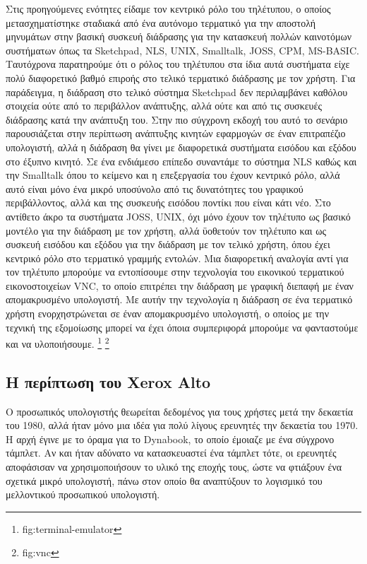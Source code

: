 \documentclass[
]{article}
\begin{document}
Στις προηγούμενες ενότητες είδαμε τον κεντρικό ρόλο του τηλέτυπου, ο
οποίος μετασχηματίστηκε σταδιακά από ένα αυτόνομο τερματικό για την
αποστολή μηνυμάτων στην βασική συσκευή διάδρασης για την κατασκευή
πολλών καινοτόμων συστήματων όπως τα Sketchpad, NLS, UNIX, Smalltalk,
JOSS, CPM, MS-BASIC. Ταυτόχρονα παρατηρούμε ότι ο ρόλος του τηλέτυπου
στα ίδια αυτά συστήματα είχε πολύ διαφορετικό βαθμό επιροής στο τελικό
τερματικό διάδρασης με τον χρήστη. Για παράδειγμα, η διάδραση στο τελικό
σύστημα Sketchpad δεν περιλαμβάνει καθόλου στοιχεία ούτε από το
περιβάλλον ανάπτυξης, αλλά ούτε και από τις συσκευές διάδρασης κατά την
ανάπτυξη του. Στην πιο σύγχρονη εκδοχή του αυτό το σενάριο παρουσιάζεται
στην περίπτωση ανάπτυξης κινητών εφαρμογών σε έναν επιτραπέζιο
υπολογιστή, αλλά η διάδραση θα γίνει με διαφορετικά συστήματα εισόδου
και εξόδου στο έξυπνο κινητό. Σε ένα ενδιάμεσο επίπεδο συναντάμε το
σύστημα NLS καθώς και την Smalltalk όπου το κείμενο και η επεξεργασία
του έχουν κεντρικό ρόλο, αλλά αυτό είναι μόνο ένα μικρό υποσύνολο από
τις δυνατότητες του γραφικού περιβάλλοντος, αλλά και της συσκευής
εισόδου ποντίκι που είναι κάτι νέο. Στο αντίθετο άκρο τα συστήματα JOSS,
UNIX, όχι μόνο έχουν τον τηλέτυπο ως βασικό μοντέλο για την διάδραση με
τον χρήστη, αλλά ϋοθετούν τον τηλέτυπο και ως συσκευή εισόδου και εξόδου
για την διάδραση με τον τελικό χρήστη, όπου έχει κεντρικό ρόλο στο
τερματικό γραμμής εντολών. Μια διαφορετική αναλογία αντί για τον
τηλέτυπο μπορούμε να εντοπίσουμε στην τεχνολογία του εικονικού
τερματικού εικονοστοιχείων VNC, το οποίο επιτρέπει την διάδραση με
γραφική διεπαφή με έναν απομακρυσμένο υπολογιστή. Με αυτήν την
τεχνολογία η διάδραση σε ένα τερματικό χρήστη ενορχηστρώνεται σε έναν
απομακρυσμένο υπολογιστή, ο οποίος με την τεχνική της εξομοίωσης μπορεί
να έχει όποια συμπεριφορά μπορούμε να φανταστούμε και να υλοποιήσουμε.
\footnote{fig:terminal-emulator} \footnote{fig:vnc}

\hypertarget{ux3b7-ux3c0ux3b5ux3c1ux3afux3c0ux3c4ux3c9ux3c3ux3b7-ux3c4ux3bfux3c5-xerox-alto}{%
\subsection{Η περίπτωση του Xerox
Alto}\label{ux3b7-ux3c0ux3b5ux3c1ux3afux3c0ux3c4ux3c9ux3c3ux3b7-ux3c4ux3bfux3c5-xerox-alto}}

Ο προσωπικός υπολογιστής θεωρείται δεδομένος για τους χρήστες μετά την
δεκαετία του 1980, αλλά ήταν μόνο μια ιδέα για πολύ λίγους ερευνητές την
δεκαετία του 1970. Η αρχή έγινε με το όραμα για το Dynabook, το οποίο
έμοιαζε με ένα σύγχρονο τάμπλετ. Αν και ήταν αδύνατο να κατασκευαστεί
ένα τάμπλετ τότε, οι ερευνητές αποφάσισαν να χρησιμοποιήσουν το υλικό
της εποχής τους, ώστε να φτιάξουν ένα σχετικά μικρό υπολογιστή, πάνω
στον οποίο θα αναπτύξουν το λογισμικό του μελλοντικού προσωπικού
υπολογιστή.
\end{document}
